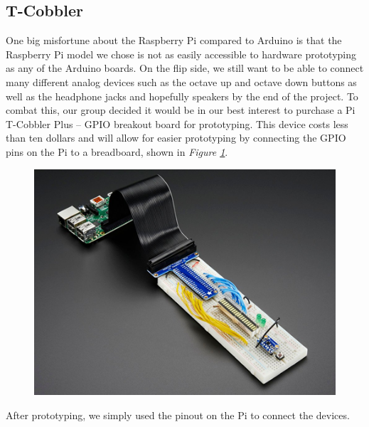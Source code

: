 \subsection{T-Cobbler}

One big misfortune about the Raspberry Pi compared to Arduino is that the Raspberry Pi model we chose is not as easily accessible to hardware prototyping as any of the Arduino boards. On the flip side, we still want to be able to connect many different analog devices such as the octave up and octave down buttons as well as the headphone jacks and hopefully speakers by the end of the project. To combat this, our group decided it would be in our best interest to purchase a Pi T-Cobbler Plus -- GPIO breakout board for prototyping. This device costs less than ten dollars and will allow for easier prototyping by connecting the GPIO pins on the Pi to a breadboard, shown in \textit{Figure \ref{fig:tcobbler}}.

\begin{figure}[h!]
  \centering
  \includegraphics[width=\linewidth]{image/TCobbler.png}
  \caption{}
  \label{fig:tcobbler}
\end{figure}
\newpage

After prototyping, we simply used the pinout on the Pi to connect the devices.
